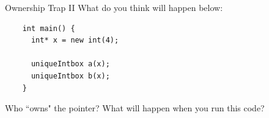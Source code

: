 \begin{frame}[fragile]{Ownership Trap II}
  What do you think will happen below:
  \begin{verbatim}
    int main() {
      int* x = new int(4);
    
      uniqueIntbox a(x);
      uniqueIntbox b(x);
    }
  \end{verbatim}

  Who ``owns" the pointer? What will happen when you run this code?
\end{frame}






      








